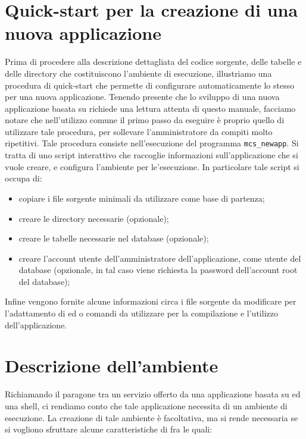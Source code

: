 \section{Quick-start per la creazione di una nuova applicazione}
Prima di procedere alla descrizione dettagliata del codice sorgente,
delle tabelle e delle directory che costituiscono l'ambiente di
esecuzione, illustriamo una procedura di quick-start che permette di
configurare automaticamente lo stesso per una nuova
applicazione. Tenendo presente che lo sviluppo di una nuova
applicazione basata su \mcs richiede una lettura attenta di
questo manuale, facciamo notare che nell'utilizzo comune il primo
passo da eseguire \`e proprio quello di utilizzare tale procedura, per
sollevare l'amministratore da compiti molto ripetitivi. Tale procedura
consiste nell'esecuzione del programma \verb|mcs_newapp|. Si tratta di
uno script interattivo che raccoglie informazioni sull'applicazione
che si vuole creare, e configura l'ambiente per le'esecuzione. In
particolare tale script si occupa di:

\begin{itemize}
\item copiare i file sorgente minimali da utilizzare come base di
  partenza;
\item creare le directory necessarie (opzionale);
\item creare le tabelle necessarie nel database (opzionale);
\item creare l'account utente dell'amministratore dell'applicazione,
  come utente del database (opzionale, in tal caso viene richiesta la
  password dell'account root del database);
\end{itemize}
%
Infine vengono fornite alcune informazioni circa i file sorgente da
modificare per l'adattamento di \mcs ed o comandi da utilizzare
per la compilazione e l'utilizzo dell'applicazione.


\section{Descrizione dell'ambiente}\label{prep_ambiente}
Richiamando il paragone tra un servizio offerto da una applicazione
basata su \mcs ed una shell, ci rendiamo conto che tale
applicazione necessita di un ambiente di esecuzione. La creazione di
tale ambiente \`e facoltativa, ma si rende necessaria se si vogliono
sfruttare alcune caratteristiche di \mcs fra le quali:

